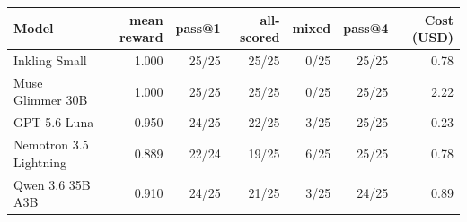 \begin{tabular}{lrrrrrr}
\toprule
Model & mean reward & pass@1 & all-scored & mixed & pass@4 & Cost (USD) \\
\midrule
Inkling Small & 1.000 & 25/25 & 25/25 & 0/25 & 25/25 & 0.78 \\
Muse Glimmer 30B & 1.000 & 25/25 & 25/25 & 0/25 & 25/25 & 2.22 \\
GPT-5.6 Luna & 0.950 & 24/25 & 22/25 & 3/25 & 25/25 & 0.23 \\
Nemotron 3.5 Lightning & 0.889 & 22/24 & 19/25 & 6/25 & 25/25 & 0.78 \\
Qwen 3.6 35B A3B & 0.910 & 24/25 & 21/25 & 3/25 & 24/25 & 0.89 \\
\bottomrule
\end{tabular}
